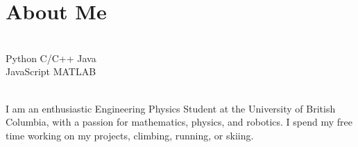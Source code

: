 \documentclass[]{deedy-resume-openfont}
\begin{document}
\vspace{10pt}


\section{About Me}
\begin{minipage}[t]{.35\textwidth}
     \\
    Python \textbullet{} C/C++ \textbullet{} Java \\
    JavaScript \textbullet{} MATLAB
    \vspace{8pt}
\end{minipage}
\hfill
\begin{minipage}[t]{.55\textwidth}
     \\
    I am an enthusiastic Engineering Physics Student at the University of British Columbia, with a passion for mathematics, physics, and robotics. I spend my free time working on my projects, climbing, running, or skiing.
\end{minipage}
\end{document}
